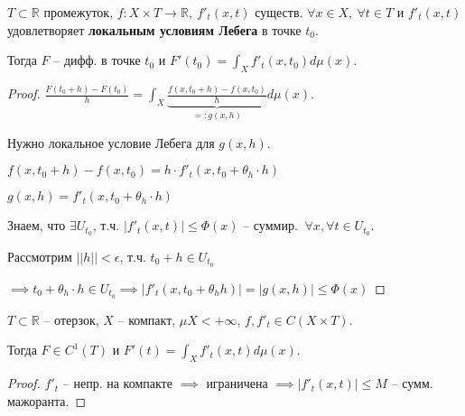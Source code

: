 \begin{theorem}
    $T \subset \mathbb{R}$ промежуток, $f : X \times T \rightarrow \mathbb{R}, \ f'_t (x, t)$ существ. $\forall x \in X, \ \forall t \in T$ и $f'_t(x, t)$ удовлетворяет \textbf{локальным условиям Лебега} в точке $t_0$.

    Тогда $F$ -- дифф. в точке $t_0$ и $F'(t_0) = \int_X { f'_t (x, t_0) d \mu (x) }$. 
\end{theorem}
\begin{proof}
    $\frac{F(t_0 + h) - F(t_0)}{h} = \int_X {\underbrace{\frac{f(x, t_0 + h) - f(x, t_0)}{h}}_{=: g(x, h)}}d \mu (x)$.

    Нужно локальное условие Лебега для $g(x, h)$.

    $f(x, t_0 + h) - f(x, t_0) = h \cdot f'_t(x, t_0 + \theta_h \cdot h)$

    $g(x, h) = f'_t(x, t_0 + \theta_h \cdot h)$

    Знаем, что $\exists U_{t_0}$, т.ч. $| f'_t(x, t) | \leq \Phi(x)$ -- суммир. $\ \forall x, \forall t \in U_{t_0}$.

    Рассмотрим $|| h || < \epsilon$, т.ч. $t_0 + h \in U_{t_0}$
    

    $\implies t_0 + \theta_h \cdot h \in U_{t_0} \implies | f'_t(x, t_0 + \theta_h h) | = |g(x, h)| \leq \Phi(x)$
\end{proof}

\begin{consequence}
    $T \subset \mathbb{R}$ -- отерзок, $X$ -- компакт, $\mu X < +\infty$, $f, f'_t \in C(X \times T)$.

    Тогда $F \in C^1(T)$ и $F'(t) = \int_X{f'_t (x, t) d \mu (x)}$.
\end{consequence}

\begin{proof}
    $f'_t$ -- непр. на компакте $\implies$ играничена $\implies | f'_t(x, t) | \leq M$ -- сумм. мажоранта.
\end{proof}



